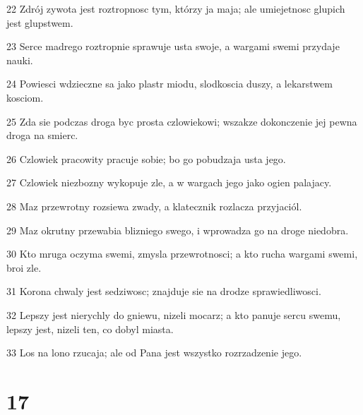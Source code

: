 \par 22 Zdrój zywota jest roztropnosc tym, którzy ja maja; ale umiejetnosc glupich jest glupstwem.
\par 23 Serce madrego roztropnie sprawuje usta swoje, a wargami swemi przydaje nauki.
\par 24 Powiesci wdzieczne sa jako plastr miodu, slodkoscia duszy, a lekarstwem kosciom.
\par 25 Zda sie podczas droga byc prosta czlowiekowi; wszakze dokonczenie jej pewna droga na smierc.
\par 26 Czlowiek pracowity pracuje sobie; bo go pobudzaja usta jego.
\par 27 Czlowiek niezbozny wykopuje zle, a w wargach jego jako ogien palajacy.
\par 28 Maz przewrotny rozsiewa zwady, a klatecznik rozlacza przyjaciól.
\par 29 Maz okrutny przewabia blizniego swego, i wprowadza go na droge niedobra.
\par 30 Kto mruga oczyma swemi, zmysla przewrotnosci; a kto rucha wargami swemi, broi zle.
\par 31 Korona chwaly jest sedziwosc; znajduje sie na drodze sprawiedliwosci.
\par 32 Lepszy jest nierychly do gniewu, nizeli mocarz; a kto panuje sercu swemu, lepszy jest, nizeli ten, co dobyl miasta.
\par 33 Los na lono rzucaja; ale od Pana jest wszystko rozrzadzenie jego.

\chapter{17}

